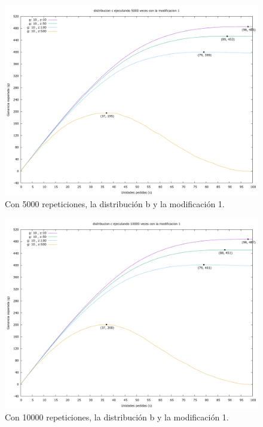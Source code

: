 \documentclass[12pt, spanish]{article}
\begin{document}
\begin{figure}[H]
	\centering
	\includegraphics[scale = 0.3]{prob_c/datos_c_5000_1.png}
	\caption{Con 5000 repeticiones, la distribución b y la modificación 1.}
	\label{fig:ej1_a_5000}

\end{figure}


\begin{figure}[H]
	\centering
	\includegraphics[scale = 0.3]{prob_c/datos_c_10000_1.png}
	\caption{Con 10000 repeticiones, la distribución b y la modificación 1.}
	\label{fig:ej1_a_10000}

\end{figure}
\end{document}
